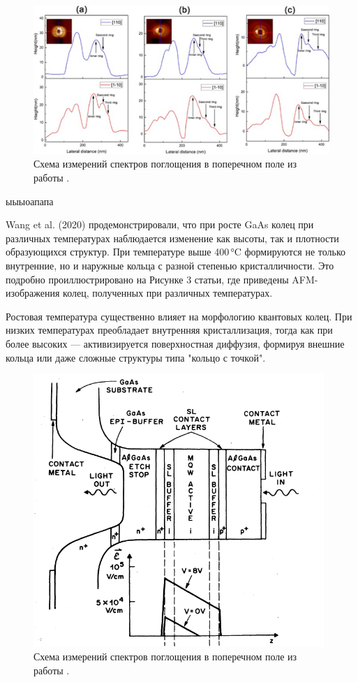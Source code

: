 \documentclass[14pt,oneside]{extarticle}
\begin{document}
\begin{figure}
\begin{center}
        \includegraphics[width=15cm]{images/Wang1-Fingure2.png}
        \caption{\label{fig:Wang1-2}
            Схема измерений спектров поглощения в поперечном поле из работы \cite{Wang1}.}
\end{center}
\end{figure}

ыыыоапапа

Wang et al. (2020) продемонстрировали, что при росте GaAs колец при различных температурах наблюдается изменение как высоты, так и плотности образующихся структур. При температуре выше 400 °C формируются не только внутренние, но и наружные кольца с разной степенью кристалличности. Это подробно проиллюстрировано на Рисунке 3 статьи, где приведены AFM-изображения колец, полученных при различных температурах.

Ростовая температура существенно влияет на морфологию квантовых колец. При низких температурах преобладает внутренняя кристаллизация, тогда как при более высоких — активизируется поверхностная диффузия, формируя внешние кольца или даже сложные структуры типа "кольцо с точкой". 

\begin{figure}
\begin{center}
    \includegraphics[width=11cm]{images/Miller2-Figure2.png}
    \caption{\label{fig:miller2-2}
        Схема измерений спектров поглощения в поперечном поле из работы \cite{miller1}.}
\end{center}
\end{figure}
    
\end{document}
